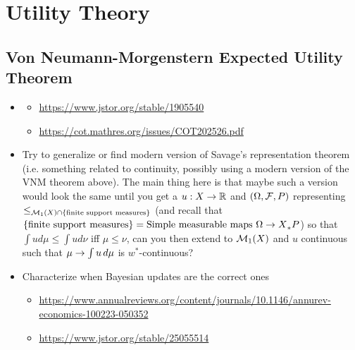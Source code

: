 \documentclass{book}
\begin{document}
	\chapter{Utility Theory}
	
	\section{Von Neumann-Morgenstern Expected Utility Theorem}
	
	\begin{itemize} 
		\item {} 
		\begin{itemize}
			\item 
			\href{https://www.jstor.org/stable/1905540}{https://www.jstor.org/stable/1905540}
			\item \href{https://cot.mathres.org/issues/COT202526.pdf}{https://cot.mathres.org/issues/COT202526.pdf} 
		\end{itemize}
		
		\item Try to generalize or find modern version of Savage's representation theorem (i.e. something related to continuity, possibly using a modern version of the VNM theorem above). The main thing here is that maybe such a version would look the same until you get a $u:X \rightarrow \mathbb{R}$ and $(\Omega, \mathcal{F}, P)$ representing $\leq_{\mathcal{M}_1(X) \cap \{\text{finite support measures}\}}$ (and recall that $\{\text{finite support measures}\} = \text{Simple measurable maps $\Omega \rightarrow X$}_*P$) so that $\int u d\mu \leq \int ud \nu $ iff $\mu \leq \nu$, can you then extend to $\mathcal{M}_1(X)$ and $u$ continuous such that $\mu \rightarrow \int u \, d \mu$ is $w^*$-continuous?
		\item Characterize when Bayesian updates are the correct ones 
		\begin{itemize}
			\item \href{https://www.annualreviews.org/content/journals/10.1146/annurev-economics-100223-050352}{https://www.annualreviews.org/content/journals/10.1146/annurev-economics-100223-050352}
			\item \href{https://www.jstor.org/stable/25055514}{https://www.jstor.org/stable/25055514} 
		\end{itemize}
	\end{itemize}
	
\end{document}
